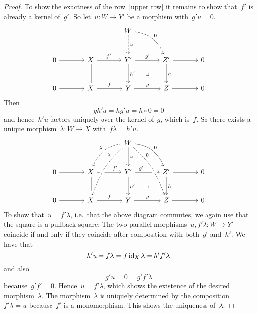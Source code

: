 \begin{proof}
  To show the exactness of the row~\eqref{upper row} it remains to show that~$f'$ is already a kernel of~$g'$.
  So let~$u \colon W \to Y'$ be a morphism with~$g' u = 0$.
  \[
    \begin{tikzcd}[sep = large]
        {}
      & {}
      & W
        \arrow[dashed]{d}[right]{u}
        \arrow[dashed, bend left]{dr}[above right]{0}
      & {}
      & {}
      \\
        0
        \arrow{r}
      & X
        \arrow{r}[above]{f'}
        \arrow[equal]{d}
      & Y'
        \arrow{r}[above]{g'}
        \arrow{d}[right]{h'}
        \arrow[phantom]{dr}[description]{\pb}
      & Z'
        \arrow{d}[right]{h}
        \arrow{r}
      & 0
      \\
        0
        \arrow{r}
      & X
        \arrow{r}[above]{f}
      & Y
        \arrow{r}[above]{g}
      & Z
        \arrow{r}
      & 0
    \end{tikzcd}
  \]
  Then
  \[
      g h' u
    = h g' u
    = h \circ 0
    = 0
  \]
  and hence~$h' u$ factors uniquely over the kernel of~$g$, which is~$f$.
  So there exists a unique morphism~$\lambda \colon W \to X$ with~$f \lambda = h' u$.
  \[
    \begin{tikzcd}[sep = large]
        {}
      & {}
      & W
        \arrow{d}[right]{u}
        \arrow[bend left]{dr}[above right]{0}
        \arrow[dashed,bend right]{dl}[above left]{\lambda}
      & {}
      & {}
      \\
        0
        \arrow{r}
      & X
        \arrow{r}[above, near end]{f'}
        \arrow[equal]{d}
      & Y'
        \arrow{r}[above, near start]{g'}
        \arrow{d}[right]{h'}
        \arrow[phantom]{dr}[description]{\pb}
      & Z'
        \arrow{r}
      & 0
      \\
        0
        \arrow{r}
      & X
        \arrow[from=uur, dashed, bend right = 15, near start, swap, "\lambda", crossing over]
        \arrow{r}[above]{f}
      & Y
        \arrow{r}[above]{g}
      & Z
        \arrow{r}
        \arrow[from=uul, dashed, bend left = 15, near start, "0", crossing over]
        \arrow[from=u, right, "h"]
      & 0
    \end{tikzcd}
  \]
  To show that~$u = f' \lambda$, i.e.\ that the above diagram commutes, we again use that the  square is a pullback square:
  The two parallel morphisms~$u, f' \lambda \colon W \to Y'$ coincide if and only if they coincide after composition with both~$g'$ and~$h'$.
  We have that
  \[
      h' u
    = f \lambda
    = f \operatorname{id}_X \lambda
    = h' f' \lambda
  \]
  and also
  \[
      g' u
    = 0
    = g' f' \lambda
  \]
  because~$g' f' = 0$.
  Hence~$u = f' \lambda$, which shows the existence of the desired morphism~$\lambda$.
  The morphism~$\lambda$ is uniquely determined by the composition~$f' \lambda = u$ because~$f'$ is a monomorphism.
  This shows the uniqueness of~$\lambda$.
\end{proof}


